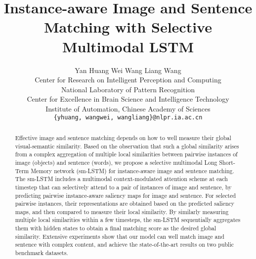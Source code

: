 \documentclass[10pt,twocolumn,letterpaper]{article}
\begin{document}
\title{Instance-aware Image and Sentence Matching with Selective Multimodal LSTM}

\author{Yan Huang \hspace{7mm} Wei Wang  \hspace{7mm} Liang Wang\\
Center for Research on Intelligent Perception and Computing\\
National Laboratory of Pattern Recognition\\
Center for Excellence in Brain Science and Intelligence Technology\\
Institute of Automation, Chinese Academy of Sciences\\
{\tt\small \{yhuang, wangwei, wangliang\}@nlpr.ia.ac.cn}
}




\makeatletter
\g@addto@macro{}
\makeatother
\maketitle


\begin{abstract}
Effective image and sentence matching depends on how to well measure
their global visual-semantic similarity.
Based on the observation that
such a global similarity arises from a complex aggregation of
multiple local similarities between
pairwise instances of image (objects) and sentence (words),
we propose a selective multimodal Long Short-Term Memory network (sm-LSTM)
for instance-aware image and sentence matching.
The sm-LSTM includes a multimodal context-modulated attention scheme at each timestep
that can selectively attend to a pair of instances of image and sentence,
by predicting pairwise instance-aware saliency maps for image and sentence.
For selected pairwise instances, their representations are obtained based on
the predicted saliency maps, and then compared to measure their local similarity.
By similarly measuring multiple local similarities within a few timesteps,
the sm-LSTM sequentially aggregates them with hidden states
to obtain a final matching score as the desired global similarity.
Extensive experiments show that
our model can well match image and sentence with complex content,
and achieve the state-of-the-art results on two public benchmark datasets.
\end{abstract}
\end{document}
